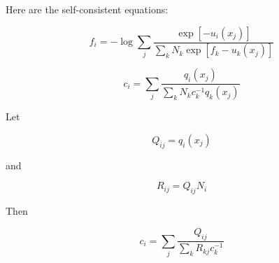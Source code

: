 \documentclass[12pt]{article}
\begin{document}
Here are the self-consistent equations:

$$f_i = -\log \sum_j \frac{\exp[-u_i(x_j)]}{\sum_k N_k \exp[f_k - u_k(x_j)]}$$

$$c_i = \sum_j \frac{q_i(x_j)}{\sum_k N_k c_k^{-1} q_k(x_j)}$$

Let

$$Q_{ij} = q_i(x_j)$$

and 

$$R_{ij} = Q_{ij} N_i$$

Then 

$$c_i = \sum_j \frac{Q_{ij}}{\sum_k R_{kj} c_k^{-1}}$$
\end{document}
